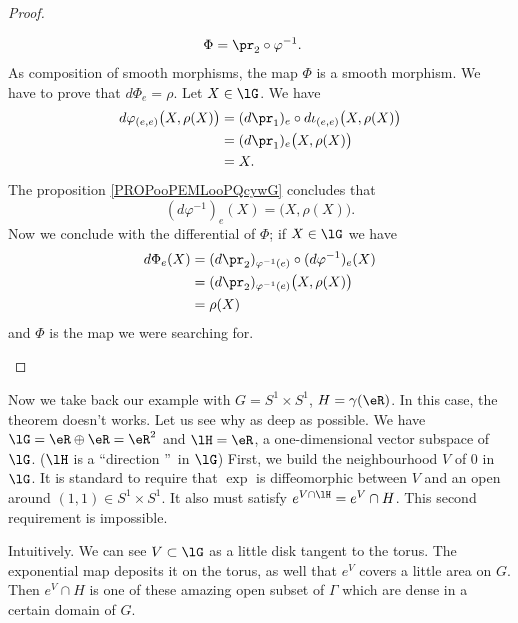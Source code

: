 \begin{proof}
\begin{subproof}
\begin{equation}
\begin{aligned}
				\Phi         & =\pr_2\circ \varphi^{-1}.
			\end{aligned}
		\end{equation}
		As composition of smooth morphisms, the map \( \Phi\) is a smooth morphism. We have to prove that \( d\Phi_e=\rho\).
		Let \( X\in\lG\). We have
		\begin{subequations}
			\begin{align}
				d\varphi_{(e,e)}\big( X,\rho(X) \big) & =(d\pr_1)_e\circ d\iota_{(e,e)}\big( X,\rho(X) \big) \\
				                                      & =(d\pr_1)_e\big( X,\rho(X) \big)                     \\
				                                      & =X.
			\end{align}
		\end{subequations}
		The proposition \ref{PROPooPEMLooPQcywG} concludes that
		\begin{equation}
			(d\varphi^{-1})_e(X)=\big( X,\rho(X) \big).
		\end{equation}
		\spitem[Conclusion]
		Now we conclude with the differential of \( \Phi\); if \( X\in\lG\) we have
		\begin{subequations}
			\begin{align}
				d\Phi_e(X) & =(d\pr_2)_{\varphi^{-1}(e)}\circ (d\varphi^{-1})_e(X) \\
				           & =(d\pr_2)_{\varphi^{-1}(e)}\big( X,\rho(X) \big)      \\
				           & =\rho(X)
			\end{align}
		\end{subequations}
		and \( \Phi\) is the map we were searching for.
	\end{subproof}
\end{proof}




Now we take back our example with $G=S^1\times S^1$, $H=\gamma(\eR)$. In this case, the theorem doesn't works. Let us see why as deep as possible. We have $\lG=\eR\oplus\eR=\eR^2$ and $\lH=\eR$, a one-dimensional vector subspace of $\lG$. ($\lH$ is a ``direction ''\ in $\lG$) First, we build the neighbourhood $V$ of $0$ in $\lG$. It is standard to require that $\exp$ is diffeomorphic between $V$ and an open around $(1,1)\in S^1\times S^1$. It also must satisfy $e^{V\cap\lH}=e^V\cap H$. This second requirement is impossible.

Intuitively. We can see $V\subset\lG$ as a little disk tangent to  the torus. The exponential map deposits it on the torus, as well that $e^V$ covers a little area on $G$. Then $e^V\cap H$ is one of these amazing open subset of $\Gamma$ which are dense in a certain domain of $G$.

